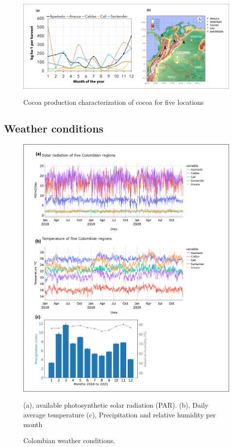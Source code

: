 \documentclass[gene,journal,article,submit,moreauthors,pdftex]{Definitions/mdpi}
\begin{document}
\begin{figure}[h]
	\centering
	\includegraphics[scale=0.3]{images/map.png}\\
	\caption{\footnotesize {Cocoa production characterization of cocoa for five locations\\}}
	\label{fig:yield}
\end{figure}
\newpage

\subsection{Weather conditions}
\begin{figure}[h!]
	\centering
	\includegraphics[scale=0.4]{images/clima.png}
	\caption{\footnotesize {Colombian weather conditions. \\}}	
	\label{fig:temp}
	{\footnotesize (a), available photosynthetic solar radiation (PAR). (b), Daily average temperature  (c), Precipitation and relative humidity per month}
\end{figure}
\newpage
\end{document}
